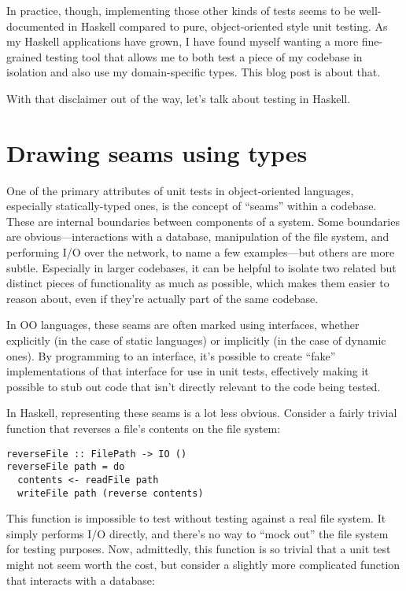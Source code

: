 In practice, though, implementing those other kinds of tests seems to be
well-documented in Haskell compared to pure, object-oriented style unit
testing. As my Haskell applications have grown, I have found myself
wanting a more fine-grained testing tool that allows me to both test a
piece of my codebase in isolation and also use my domain-specific types.
This blog post is about that.

With that disclaimer out of the way, let's talk about testing in
Haskell.

\hypertarget{drawing-seams-using-types}{%
\section{Drawing seams using types}\label{drawing-seams-using-types}}

One of the primary attributes of unit tests in object-oriented
languages, especially statically-typed ones, is the concept of ``seams''
within a codebase. These are internal boundaries between components of a
system. Some boundaries are obvious---interactions with a database,
manipulation of the file system, and performing I/O over the network, to
name a few examples---but others are more subtle. Especially in larger
codebases, it can be helpful to isolate two related but distinct pieces
of functionality as much as possible, which makes them easier to reason
about, even if they're actually part of the same codebase.

In OO languages, these seams are often marked using interfaces, whether
explicitly (in the case of static languages) or implicitly (in the case
of dynamic ones). By programming to an interface, it's possible to
create ``fake'' implementations of that interface for use in unit tests,
effectively making it possible to stub out code that isn't directly
relevant to the code being tested.

In Haskell, representing these seams is a lot less obvious. Consider a
fairly trivial function that reverses a file's contents on the file
system:

\begin{verbatim}
reverseFile :: FilePath -> IO ()
reverseFile path = do
  contents <- readFile path
  writeFile path (reverse contents)
\end{verbatim}
This function is impossible to test without testing against a real file
system. It simply performs I/O directly, and there's no way to ``mock
out'' the file system for testing purposes. Now, admittedly, this
function is so trivial that a unit test might not seem worth the cost,
but consider a slightly more complicated function that interacts with a
database:

